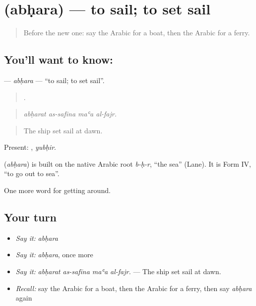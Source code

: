 \section[\texorpdfstring{\ar{أبحر} (abḥara)}{أبحر (abḥara)}]{ (abḥara) — to sail; to set sail}

\label{lesson:AR-C429-abhara}



\begin{quote}
Before the new one: say the Arabic for a boat, then the Arabic for a ferry.
\end{quote}

\subsection*{You'll want to know: }
\textbf{} — \emph{abḥara} — \textquotedblleft{}to sail; to set sail\textquotedblright{}.

\begin{quote}
   .
\end{quote}

\begin{quote}
\emph{abḥarat as-safīna maʿa al-fajr.}
\end{quote}

\begin{quote}
The ship set sail at dawn.
\end{quote}

Present: , \emph{yubḥir}.

\begin{cousinweb}
\textbf{} (\emph{abḥara}) is built on the native Arabic root \emph{b-ḥ-r}, \textquotedblleft{}the sea\textquotedblright{} (Lane). It is Form IV, \textquotedblleft{}to go out to sea\textquotedblright{}.
\end{cousinweb}

\begin{grammarlens}[title={What you've built}]
One more word for getting around.
\end{grammarlens}

\subsection*{Your turn}
\begin{itemize}
\raggedright
  \item \emph{Say it:} \emph{abḥara}
  \item \emph{Say it:} \emph{abḥara}, once more
  \item \emph{Say it:} \emph{abḥarat as-safīna maʿa al-fajr.} — The ship set sail at dawn.
  \item \emph{Recall:} say the Arabic for a boat, then the Arabic for a ferry, then say \emph{abḥara} again
\end{itemize}

